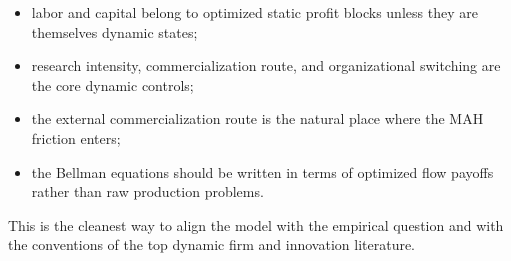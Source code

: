 \documentclass[12pt]{article}
\begin{document}
\begin{itemize}[leftmargin=2em]
    \item labor and capital belong to optimized static profit blocks unless they are themselves dynamic states;
    \item research intensity, commercialization route, and organizational switching are the core dynamic controls;
    \item the external commercialization route is the natural place where the MAH friction enters;
    \item the Bellman equations should be written in terms of optimized flow payoffs rather than raw production problems.
\end{itemize}

This is the cleanest way to align the model with the empirical question and with the
conventions of the top dynamic firm and innovation literature.
\end{document}

